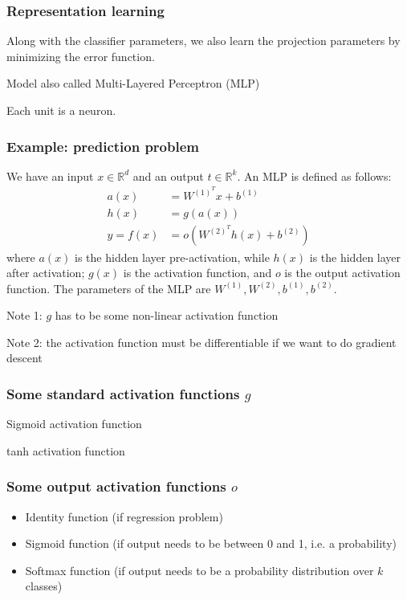 \documentclass[a4paper,12pt]{article}
\begin{document}
\subsubsection{Representation learning}

Along with the classifier parameters, we also learn the projection parameters by minimizing the error function. 

Model also called Multi-Layered Perceptron (MLP)

Each unit is a neuron.

\subsubsection{Example: prediction problem}

We have an input $x \in \mathbb{R}^d$ and an output $t \in \mathbb{R}^k$. An MLP is defined as follows: 
\begin{align*}
a(x) &= W^{(1)^T}x + b^{(1)}\\
h(x) &= g(a(x)) \\
y = f(x) &= o (W^{(2)^T}h(x) + b^{(2)})
\end{align*}
where $a(x)$ is the hidden layer pre-activation, while $h(x)$ is the hidden layer after activation; $g(x)$ is the activation function, and $o$ is the output activation function. The parameters of the MLP are $W^{(1)}, W^{(2)}, b^{(1)}, b^{(2)}$. 

Note 1: $g$ has to be some non-linear activation function

Note 2: the activation function must be differentiable if we want to do gradient descent

\subsubsection{Some standard activation functions $g$}

Sigmoid activation function

tanh activation function

\subsubsection{Some output activation functions $o$}

\begin{itemize}
\item Identity function (if regression problem)
\item Sigmoid function (if output needs to be between 0 and 1, i.e. a probability)
\item Softmax function (if output needs to be a probability distribution over $k$ classes)
\end{itemize}
\end{document}

